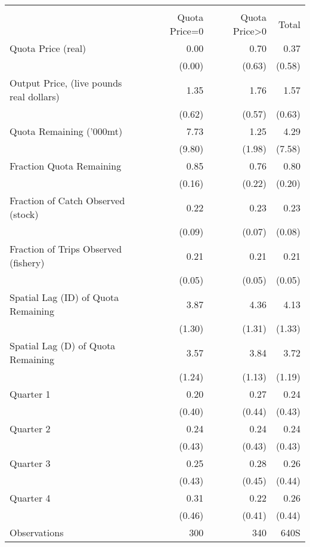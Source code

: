 \begin{tabular}{l*{3}{r}}
\hline\hline
                    &\multicolumn{3}{c}{}                  \\
                    &Quota Price=0&Quota Price>0&       Total\\
\hline
Quota Price (real)  &        0.00&        0.70&        0.37\\
                    &      (0.00)&      (0.63)&      (0.58)\\
Output Price, (live pounds real dollars)&        1.35&        1.76&        1.57\\
                    &      (0.62)&      (0.57)&      (0.63)\\
Quota Remaining ('000mt)&        7.73&        1.25&        4.29\\
                    &      (9.80)&      (1.98)&      (7.58)\\
Fraction Quota Remaining&        0.85&        0.76&        0.80\\
                    &      (0.16)&      (0.22)&      (0.20)\\
Fraction of Catch Observed (stock)&        0.22&        0.23&        0.23\\
                    &      (0.09)&      (0.07)&      (0.08)\\
Fraction of Trips Observed (fishery)&        0.21&        0.21&        0.21\\
                    &      (0.05)&      (0.05)&      (0.05)\\
Spatial Lag (ID) of Quota Remaining&        3.87&        4.36&        4.13\\
                    &      (1.30)&      (1.31)&      (1.33)\\
Spatial Lag (D) of Quota Remaining&        3.57&        3.84&        3.72\\
                    &      (1.24)&      (1.13)&      (1.19)\\
Quarter 1           &        0.20&        0.27&        0.24\\
                    &      (0.40)&      (0.44)&      (0.43)\\
Quarter 2           &        0.24&        0.24&        0.24\\
                    &      (0.43)&      (0.43)&      (0.43)\\
Quarter 3           &        0.25&        0.28&        0.26\\
                    &      (0.43)&      (0.45)&      (0.44)\\
Quarter 4           &        0.31&        0.22&        0.26\\
                    &      (0.46)&      (0.41)&      (0.44)\\
Observations        &      300&      340&  640S          \\
\hline\hline
\end{tabular}
